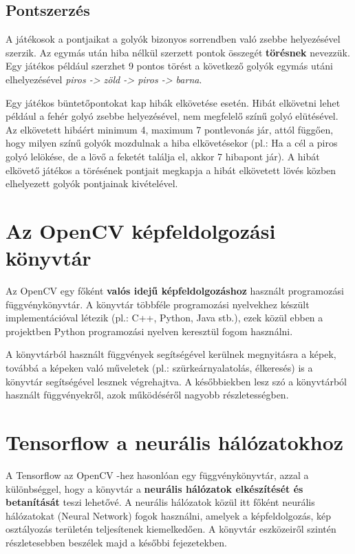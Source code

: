\subsection{Pontszerzés}
A játékosok a pontjaikat a golyók bizonyos sorrendben való zsebbe helyezésével szerzik. Az egymás után hiba nélkül szerzett pontok összegét \textbf{törésnek} nevezzük. Egy játékos például szerzhet 9 pontos törést a következő golyók egymás utáni elhelyezésével \textit{piros -> zöld -> piros -> barna}.\cite{shamos2002new}
\par Egy játékos büntetőpontokat kap hibák elkövetése esetén. Hibát elkövetni lehet például a fehér golyó zsebbe helyezésével, nem megfelelő színű golyó elütésével. Az elkövetett hibáért minimum 4, maximum 7 pontlevonás jár, attól függően, hogy milyen színű golyók mozdulnak a hiba elkövetésekor (pl.: Ha a cél a piros golyó lelökése, de a lövő a feketét találja el, akkor 7 hibapont jár). A hibát elkövető játékos a törésének pontjait megkapja a hibát elkövetett lövés közben elhelyezett golyók pontjainak kivételével.\cite{snooker_rules}

\section{Az OpenCV képfeldolgozási könyvtár}
Az OpenCV egy főként \textbf{valós idejű képfeldolgozáshoz} használt programozási függvénykönyvtár. A könyvtár többféle programozási nyelvekhez készült implementációval létezik (pl.: C++, Python, Java stb.)\cite{opencv_2020}, ezek közül ebben a projektben Python programozási nyelven keresztül fogom használni.
\par A könyvtárból használt függvények segítségével kerülnek megnyitásra a képek, továbbá a képeken való műveletek (pl.: szürkeárnyalatolás, élkeresés) is a könyvtár segítségével lesznek végrehajtva. A későbbiekben lesz szó a könyvtárból használt függvényekről, azok működéséről nagyobb részletességben.

\section{Tensorflow a neurális hálózatokhoz}
A Tensorflow az OpenCV -hez hasonlóan egy függvénykönyvtár, azzal a különbséggel, hogy a könyvtár a \textbf{neurális hálózatok elkészítését és betanítását} teszi lehetővé.\cite{tensorflow} A neurális hálózatok közül itt főként neurális hálózatokat (Neural Network) fogok használni, amelyek a képfeldolgozás, kép osztályozás területén teljesítenek kiemelkedően. A könyvtár eszközeiről szintén részletesebben beszélek majd a későbbi fejezetekben.